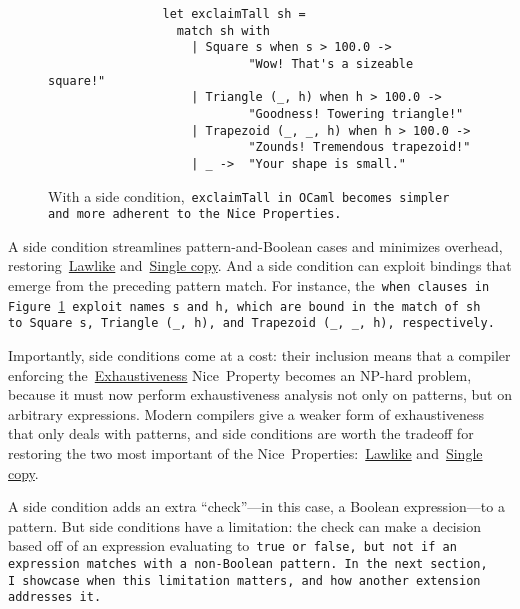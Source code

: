 \documentclass[manuscript,screen 12pt, nonacm]{acmart}
\begin{document}
        \begin{figure}[]
            \begin{verbatim}
                let exclaimTall sh =
                  match sh with 
                    | Square s when s > 100.0 ->
                            "Wow! That's a sizeable square!"
                    | Triangle (_, h) when h > 100.0 ->
                            "Goodness! Towering triangle!"
                    | Trapezoid (_, _, h) when h > 100.0 -> 
                            "Zounds! Tremendous trapezoid!"
                    | _ ->  "Your shape is small." 
                \end{verbatim}
            \caption{With a side condition,~\tt{exclaimTall} in OCaml becomes
            simpler and more adherent to the Nice~Properties.} 
            \label{fig:whenexclaimtall}
        \end{figure}

    A side condition streamlines pattern-and-Boolean cases and minimizes
    overhead, restoring~\hyperref[p1]{Lawlike} and~\hyperref[p2]{Single copy}.
    And a side condition can exploit bindings that emerge from the preceding
    pattern match. For instance, the~\tt{when} clauses in
    Figure~\ref{fig:whenexclaimtall} exploit names~\tt{s} and~\tt{h}, which are
    bound in the match of~\tt{sh} to~\tt{Square s},~\tt{Triangle (\_, h)}, and
    \tt{Trapezoid (\_,~\_, h)}, respectively. 

    Importantly, side conditions come at a cost: their inclusion means that a
    compiler enforcing the~\hyperref[p5]{Exhaustiveness} Nice~Property becomes
    an NP-hard problem, because it must now perform exhaustiveness analysis not
    only on patterns, but on arbitrary expressions. Modern compilers give a
    weaker form of exhaustiveness that only deals with patterns, and side
    conditions are worth the tradeoff for restoring the two most important of
    the Nice~Properties:~\hyperref[p1]{Lawlike} and~\hyperref[p2]{Single copy}.

    A side condition adds an extra “check”---in this case, a Boolean
    expression---to a pattern. But side conditions have a limitation: the check
    can make a decision based off of an expression evaluating to~\tt{true} or
    \tt{false}, but not if an expression matches with a non-Boolean pattern. In
    the next section, I~showcase when this limitation matters, and how another
    extension addresses it. 
\end{document}
